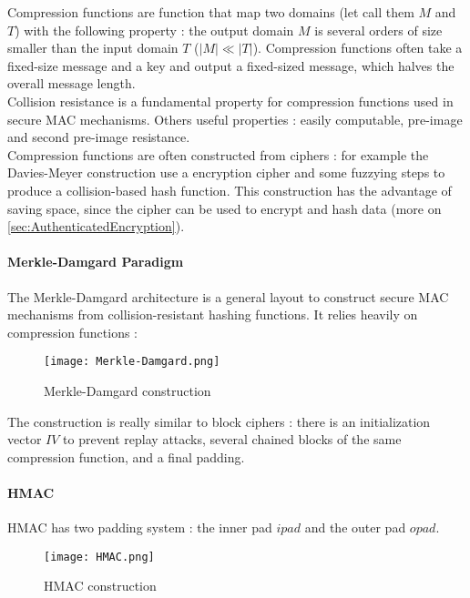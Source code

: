 Compression functions are function that map two domains (let call them $M$ and $T$) with the following property : the output domain $M$ is several orders of size smaller than the input domain $T$ ($|M| \ll |T|$). Compression functions often take a fixed-size message and a key and output a fixed-sized message, which halves the overall message length. \\
Collision resistance is a fundamental property for compression functions used in secure MAC mechanisms. Others useful properties : easily computable, pre-image and second pre-image resistance. \\
Compression functions are often constructed from ciphers : for example the Davies-Meyer construction use a encryption cipher and some fuzzying steps to produce a collision-based hash function. This construction has the advantage of saving space, since the cipher can be used to encrypt and hash data (more on \ref{sec:AuthenticatedEncryption}).

\paragraph{Merkle-Damgard Paradigm}

The Merkle-Damgard architecture is a general layout to construct secure MAC mechanisms from collision-resistant hashing functions. It relies heavily on compression functions :

\begin{figure}[h!]
	\centering
		\texttt{[image: Merkle-Damgard.png]}
	\caption{Merkle-Damgard construction}
	\label{fig:MerkleDamgardConstruction}
\end{figure}

The construction is really similar to block ciphers : there is an initialization vector $IV$ to prevent replay attacks, several chained blocks of the same compression function, and a final padding. 

\paragraph{HMAC}

HMAC has two padding system : the inner pad $ipad$ and the outer pad $opad$.

\begin{figure}[h!]
	\centering
		\texttt{[image: HMAC.png]}
	\caption{HMAC construction}
	\label{fig:HMACConstruction}
\end{figure}

